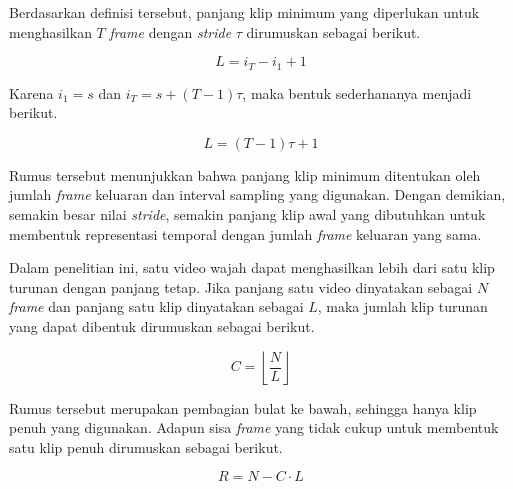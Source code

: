 Berdasarkan definisi tersebut, panjang klip minimum yang diperlukan untuk menghasilkan $T$ \textit{frame} dengan \textit{stride} $\tau$ dirumuskan sebagai berikut.

\vspace{0.5\baselineskip}
\begin{equation}
L = i_T - i_1 + 1
\label{eq:clip-length-general}
\end{equation}
\vspace{0.5\baselineskip}

Karena $i_1 = s$ dan $i_T = s + (T-1)\tau$, maka bentuk sederhananya menjadi berikut.

\vspace{0.5\baselineskip}
\begin{equation}
L = (T-1)\tau + 1
\label{eq:clip-length-simplified}
\end{equation}
\vspace{0.5\baselineskip}

Rumus tersebut menunjukkan bahwa panjang klip minimum ditentukan oleh jumlah \textit{frame} keluaran dan interval sampling yang digunakan. Dengan demikian, semakin besar nilai \textit{stride}, semakin panjang klip awal yang dibutuhkan untuk membentuk representasi temporal dengan jumlah \textit{frame} keluaran yang sama. \par

Dalam penelitian ini, satu video wajah dapat menghasilkan lebih dari satu klip turunan dengan panjang tetap. Jika panjang satu video dinyatakan sebagai $N$ \textit{frame} dan panjang satu klip dinyatakan sebagai $L$, maka jumlah klip turunan yang dapat dibentuk dirumuskan sebagai berikut.

\vspace{0.5\baselineskip}
\begin{equation}
C = \left\lfloor \frac{N}{L} \right\rfloor
\label{eq:number-of-clips}
\end{equation}
\vspace{0.5\baselineskip}

Rumus tersebut merupakan pembagian bulat ke bawah, sehingga hanya klip penuh yang digunakan. Adapun sisa \textit{frame} yang tidak cukup untuk membentuk satu klip penuh dirumuskan sebagai berikut.

\vspace{0.5\baselineskip}
\begin{equation}
R = N - C \cdot L
\label{eq:remaining-frames}
\end{equation}
\vspace{0.5\baselineskip}

